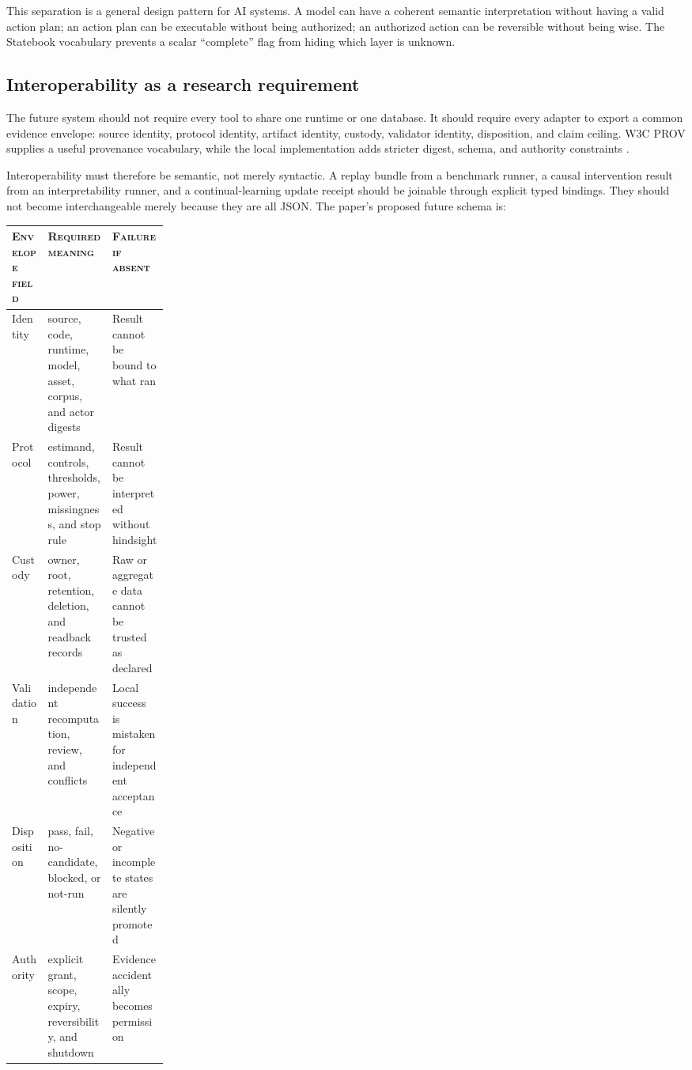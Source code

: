 \documentclass[11pt,twoside]{article}
\newcommand{\sourcecite}[1]{\parencite{#1}}
\begin{document}
  This separation is a general design pattern for AI systems. A model can have a coherent semantic interpretation without having a valid action plan; an action plan can be executable without being authorized; an authorized action can be reversible without being wise. The Statebook vocabulary prevents a scalar ``complete'' flag from hiding which layer is unknown.

\subsection{Interoperability as a research requirement}

  The future system should not require every tool to share one runtime or one database. It should require every adapter to export a common evidence envelope: source identity, protocol identity, artifact identity, custody, validator identity, disposition, and claim ceiling. W3C PROV supplies a useful provenance vocabulary, while the local implementation adds stricter digest, schema, and authority constraints \sourcecite{w3c2013prov}.

  Interoperability must therefore be semantic, not merely syntactic. A replay bundle from a benchmark runner, a causal intervention result from an interpretability runner, and a continual-learning update receipt should be joinable through explicit typed bindings. They should not become interchangeable merely because they are all JSON. The paper's proposed future schema is:

\begin{center}
\begin{tabularx}{\linewidth}{@{}P{0.23\linewidth}Y Y@{}}
\toprule
\textsc{Envelope field} & \textsc{Required meaning} & \textsc{Failure if absent} \\
\midrule
Identity & source, code, runtime, model, asset, corpus, and actor digests & Result cannot be bound to what ran \\
Protocol & estimand, controls, thresholds, power, missingness, and stop rule & Result cannot be interpreted without hindsight \\
Custody & owner, root, retention, deletion, and readback records & Raw or aggregate data cannot be trusted as declared \\
Validation & independent recomputation, review, and conflicts & Local success is mistaken for independent acceptance \\
Disposition & pass, fail, no-candidate, blocked, or not-run & Negative or incomplete states are silently promoted \\
Authority & explicit grant, scope, expiry, reversibility, and shutdown & Evidence accidentally becomes permission \\
\bottomrule
\end{tabularx}
\end{center}
\end{document}
